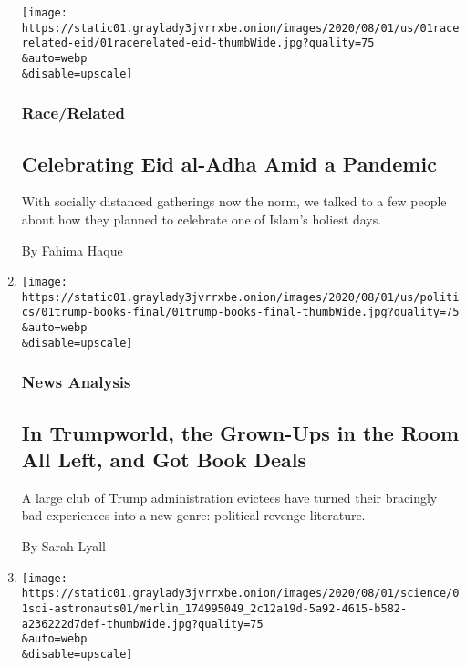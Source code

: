 \begin{enumerate}
  \texttt{[image: https://static01.graylady3jvrrxbe.onion/images/2020/08/01/us/01racerelated-eid/01racerelated-eid-thumbWide.jpg?quality=75\\\&auto=webp\\\&disable=upscale]}

  \hypertarget{racerelated-1}{%
  \subsubsection{Race/Related}\label{racerelated-1}}

  \hypertarget{celebrating-eid-al-adha-amid-a-pandemic-1}{%
  \subsection{Celebrating Eid al-Adha Amid a
  Pandemic}\label{celebrating-eid-al-adha-amid-a-pandemic-1}}

  With socially distanced gatherings now the norm, we talked to a few
  people about how they planned to celebrate one of Islam's holiest
  days.

  By Fahima Haque
\item
  \href{/2020/08/01/us/politics/trump-books.html}{}

  \texttt{[image: https://static01.graylady3jvrrxbe.onion/images/2020/08/01/us/politics/01trump-books-final/01trump-books-final-thumbWide.jpg?quality=75\\\&auto=webp\\\&disable=upscale]}

  \hypertarget{news-analysis}{%
  \subsubsection{News Analysis}\label{news-analysis}}

  \hypertarget{in-trumpworld-the-grown-ups-in-the-room-all-left-and-got-book-deals}{%
  \subsection{In Trumpworld, the Grown-Ups in the Room All Left, and Got
  Book
  Deals}\label{in-trumpworld-the-grown-ups-in-the-room-all-left-and-got-book-deals}}

  A large club of Trump administration evictees have turned their
  bracingly bad experiences into a new genre: political revenge
  literature.

  By Sarah Lyall
\item
  \href{/2020/08/01/science/nasa-spacex-astronauts.html}{}

  \texttt{[image: https://static01.graylady3jvrrxbe.onion/images/2020/08/01/science/01sci-astronauts01/merlin\_174995049\_2c12a19d-5a92-4615-b582-a236222d7def-thumbWide.jpg?quality=75\\\&auto=webp\\\&disable=upscale]}


\end{enumerate}
